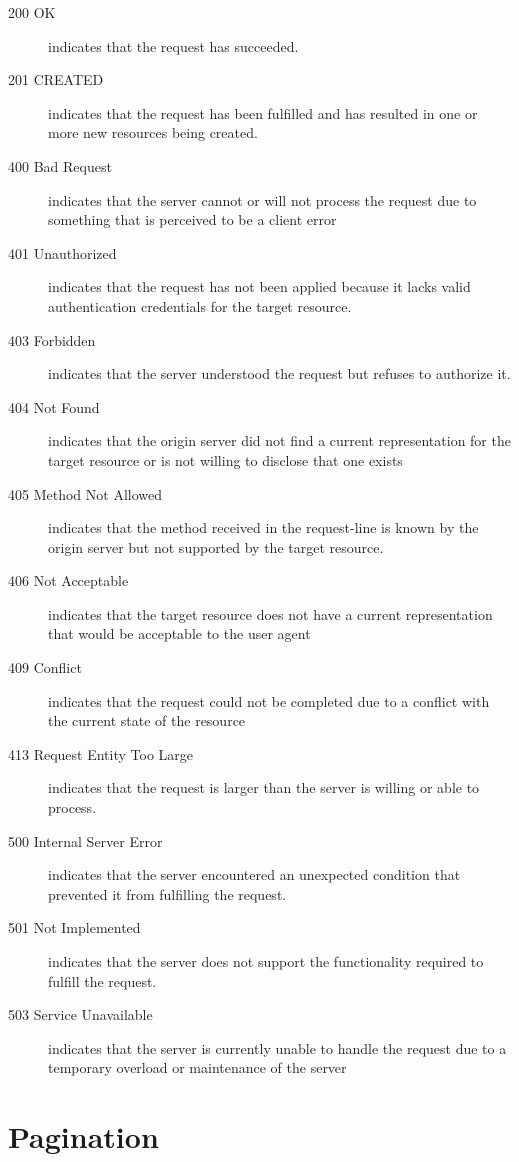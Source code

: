 \documentclass[10pt,a4paper]{article}
\begin{document}
\begin{description}
\item[200 OK] indicates that the request has succeeded.
\item[201 CREATED] indicates that the request has been fulfilled and has resulted in one or more new resources being created.
\item[400 Bad Request] indicates that the server cannot or will not process the request due to something that is perceived to be a client error
\item[401 Unauthorized] indicates that the request has not been applied because it lacks valid authentication credentials for the target resource.
\item[403 Forbidden] indicates that the server understood the request but refuses to authorize it.
\item[404 Not Found] indicates that the origin server did not find a current representation for the target resource or is not willing to disclose that one exists
\item[405 Method Not Allowed] indicates that the method received in the request-line is known by the origin server but not supported by the target resource.
\item[406 Not Acceptable] indicates that the target resource does not have a current representation that would be acceptable to the user agent
\item[409 Conflict] indicates that the request could not be completed due to a conflict with the current state of the resource
\item[413 Request Entity Too Large] indicates that the request is larger than the server is willing or able to process.
\item[500 Internal Server Error] indicates that the server encountered an unexpected condition that prevented it from fulfilling the request.
\item[501 Not Implemented] indicates that the server does not support the functionality required to fulfill the request.
\item[503 Service Unavailable] indicates that the server is currently unable to handle the request due to a temporary overload or maintenance of the server
\end{description}

\section{Pagination}
\end{document}
